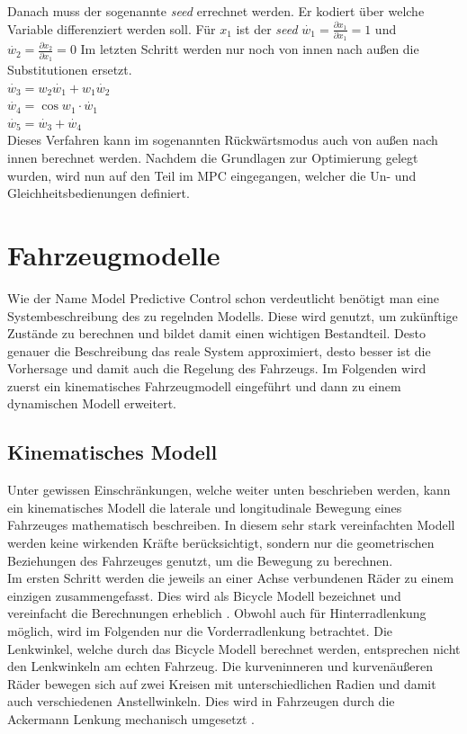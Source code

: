 \documentclass{like}
\begin{document}
Danach muss der sogenannte \textit{seed} errechnet werden. Er kodiert über welche Variable differenziert werden soll. Für $x_1$ ist der \textit{seed} $\dot{w_1} = \frac{\partial x_1}{\partial x_1} = 1$ und   $\dot{w_2} = \frac{\partial x_2}{\partial x_1} = 0$
Im letzten Schritt werden nur noch von innen nach außen die Substitutionen ersetzt. \\
$\dot{w_3} = w_2\dot{w_1} + w_1 \dot{w_2}$ \\
$\dot{w_4} = \cos{w_1} \cdot \dot{w_1}$ \\
$\dot{w_5} = \dot{w_3} + \dot{w_4}$ \\
Dieses Verfahren kann im sogenannten Rückwärtsmodus auch von außen nach innen berechnet werden. Nachdem die Grundlagen zur Optimierung gelegt wurden, wird nun auf den Teil im \acl{MPC} eingegangen, welcher die Un- und Gleichheitsbedienungen definiert. 


\section{Fahrzeugmodelle}

Wie der Name Model Predictive Control schon verdeutlicht benötigt man eine Systembeschreibung des zu regelnden Modells. Diese wird genutzt, um zukünftige Zustände zu berechnen und bildet damit einen wichtigen Bestandteil. Desto genauer die Beschreibung das reale System approximiert, desto besser ist die Vorhersage und damit auch die Regelung des Fahrzeugs.
Im Folgenden wird zuerst ein kinematisches Fahrzeugmodell eingeführt und dann zu einem dynamischen Modell erweitert.   

\subsection{Kinematisches Modell}
\label{kinematicModel}
Unter gewissen Einschränkungen, welche weiter unten beschrieben werden, kann ein kinematisches Modell die laterale und longitudinale Bewegung eines Fahrzeuges mathematisch beschreiben. In diesem sehr stark vereinfachten Modell werden keine wirkenden Kräfte berücksichtigt, sondern nur die geometrischen Beziehungen des Fahrzeuges genutzt, um die Bewegung zu berechnen. \\
Im ersten Schritt werden die jeweils an einer Achse verbundenen Räder zu einem einzigen zusammengefasst. Dies wird als Bicycle Modell bezeichnet und vereinfacht die Berechnungen erheblich \cite{BicycleModel}. Obwohl auch für Hinterradlenkung möglich, wird im Folgenden nur die Vorderradlenkung betrachtet. Die Lenkwinkel, welche durch das Bicycle Modell berechnet werden, entsprechen nicht den Lenkwinkeln am echten Fahrzeug. Die kurveninneren und kurvenäußeren Räder bewegen sich auf zwei Kreisen mit unterschiedlichen Radien und damit auch verschiedenen Anstellwinkeln. Dies wird in Fahrzeugen durch die Ackermann Lenkung mechanisch umgesetzt \cite{rajamani2011vehicle}.
\end{document}
